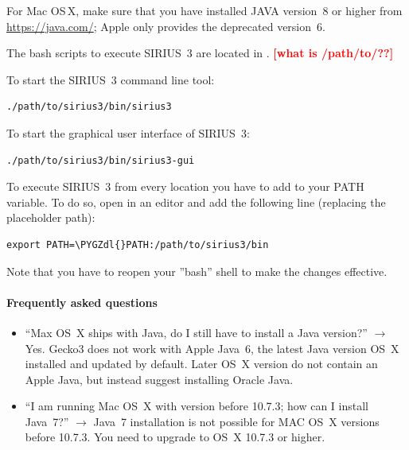 \documentclass[letterpaper,10pt,openany,oneside]{sphinxmanual}
\newcommand{\todo}[1]{\xspace{\bfseries\sffamily\textcolor{red}{[#1]}}\xspace}
\def\PYGZdl{\char`\$}
\begin{document}
For Mac OS\,X, make sure that you have installed JAVA version~8 or higher
from \url{https://java.com/}; Apple only provides the deprecated version~6.

The bash scripts to execute SIRIUS~3 are located in
.  \todo{what is /path/to/??}

To start the SIRIUS~3 command line tool:
\begin{Verbatim}[commandchars=\\\{\}]
./path/to/sirius3/bin/sirius3
\end{Verbatim}

To start the graphical user interface of SIRIUS~3:
\begin{Verbatim}[commandchars=\\\{\}]
./path/to/sirius3/bin/sirius3-gui
\end{Verbatim}

To execute SIRIUS~3 from every location you have to add 
to your PATH variable. To do so, open  in an 
editor and add the following line (replacing the placeholder path):
\begin{Verbatim}[commandchars=\\\{\}]
export PATH=\PYGZdl{}PATH:/path/to/sirius3/bin
\end{Verbatim}
Note that you have to reopen your ''bash'' shell to make the changes effective.


\paragraph{Frequently asked questions}

\begin{itemize}
\item ``Max OS~X ships with Java, do I still have to install a Java
  version?''  $\to$ Yes. Gecko3 does not work with Apple Java~6, the latest
  Java version OS~X installed and updated by default. Later OS~X version do
  not contain an Apple Java, but instead suggest installing Oracle Java.

\item ``I am running Mac OS~X with version before 10.7.3; how can I install
  Java~7?'' $\to$ Java~7 installation is not possible for MAC OS~X versions
  before 10.7.3. You need to upgrade to OS~X 10.7.3 or higher.
\end{itemize}


\end{document}
